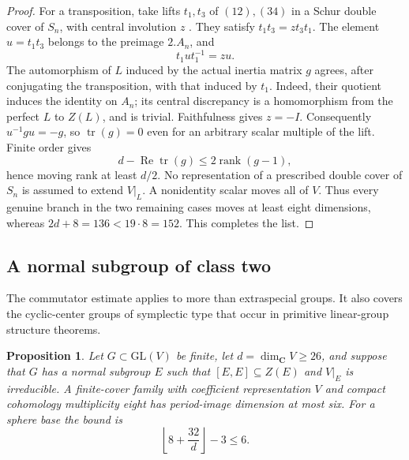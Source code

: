 \documentclass[11pt]{article}
\newtheorem{proposition}[theorem]{Proposition}
\theoremstyle{definition}
\theoremstyle{remark}
\begin{document}
\begin{proof}
For a transposition, take lifts $t_1,t_3$ of $(12),(34)$ in
a Schur double cover of $S_n$, with central involution $z$
\cite[Section~4.1]{FayersMorotti}. They satisfy $t_1t_3=zt_3t_1$. The element $u=t_1t_3$ belongs
to the preimage $2.A_n$, and
\[
 t_1ut_1^{-1}=zu.
\]
The automorphism of $L$ induced by the actual inertia matrix
$g$ agrees, after conjugating the transposition, with that induced
by $t_1$. Indeed, their quotient induces the identity on $A_n$;
its central discrepancy is a homomorphism from the perfect
$L$ to $Z(L)$, and is trivial. Faithfulness gives $z=-I$.
Consequently $u^{-1}gu=-g$, so $\operatorname{tr}(g)=0$ even
for an arbitrary scalar multiple of the lift. Finite order gives
\[
 d-\operatorname{Re}\operatorname{tr}(g)
 \leq2\operatorname{rank}(g-1),
\]
hence moving rank at least $d/2$. No representation of a
prescribed double cover of $S_n$ is assumed to extend $V|_L$.
A nonidentity scalar moves all of $V$. Thus every genuine branch
in the two remaining cases moves at least eight dimensions,
whereas $2d+8=136<19\cdot8=152$. This completes the list.
\end{proof}


\subsection{A normal subgroup of class two}

The commutator estimate applies to more than extraspecial groups.
It also covers the cyclic-center groups of symplectic type that
occur in primitive linear-group structure theorems.

\begin{proposition}\label{prop:extraspecial-cover-obstruction}
Let $G\subset\mathrm{GL}(V)$ be finite, let
$d=\dim_{\mathbf C}V\geq26$, and suppose that $G$ has a normal
subgroup $E$ such that $[E,E]\subseteq Z(E)$ and $V|_E$ is
irreducible.  A finite-cover family with coefficient
representation $V$ and compact cohomology multiplicity eight
has period-image dimension at most six.  For a sphere base the
bound is
\[
 \left\lfloor8+\frac{32}{d}\right\rfloor-3\leq6.
\]
\end{proposition}
\end{document}
